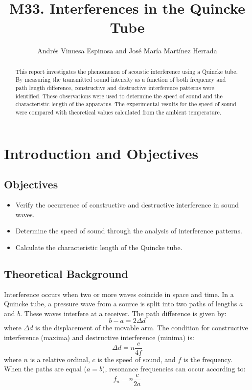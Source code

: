 \documentclass[a4paper,11pt]{article}
\begin{document}
\title{M33. Interferences in the Quincke Tube}
\author{Andrés Vinuesa Espinosa and José María Martínez Herrada}
\maketitle

\begin{abstract}
This report investigates the phenomenon of acoustic interference using a Quincke tube. By measuring the transmitted sound intensity as a function of both frequency and path length difference, constructive and destructive interference patterns were identified. These observations were used to determine the speed of sound and the characteristic length of the apparatus. The experimental results for the speed of sound were compared with theoretical values calculated from the ambient temperature.
\end{abstract}

\section{Introduction and Objectives}

\subsection{Objectives}
\begin{itemize}
    \item Verify the occurrence of constructive and destructive interference in sound waves.
    \item Determine the speed of sound through the analysis of interference patterns.
    \item Calculate the characteristic length of the Quincke tube.
\end{itemize}

\subsection{Theoretical Background}
Interference occurs when two or more waves coincide in space and time. In a Quincke tube, a pressure wave from a source is split into two paths of lengths $a$ and $b$. These waves interfere at a receiver. The path difference is given by:
\begin{equation}
    b - a = 2\Delta d
\end{equation}
where $\Delta d$ is the displacement of the movable arm. The condition for constructive interference (maxima) and destructive interference (minima) is:
\begin{equation}
    \Delta d = n \frac{c}{4f}
\end{equation}
where $n$ is a relative ordinal, $c$ is the speed of sound, and $f$ is the frequency. When the paths are equal ($a=b$), resonance frequencies can occur according to:
\begin{equation}
    f_n = n \frac{c}{2a}
\end{equation}
\end{document}
